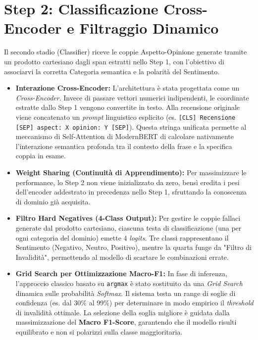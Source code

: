 \documentclass[10pt,a4paper]{report}
\begin{document}
\section{Step 2: Classificazione Cross-Encoder e Filtraggio Dinamico}
Il secondo stadio (Classifier) riceve le coppie Aspetto-Opinione generate tramite un prodotto cartesiano dagli span estratti nello Step 1, con l'obiettivo di associarvi la corretta Categoria semantica e la polarità del Sentimento.

\begin{itemize}
    \item \textbf{Interazione Cross-Encoder:} L'architettura è stata progettata come un \textit{Cross-Encoder}. Invece di passare vettori numerici indipendenti, le coordinate estratte dallo Step 1 vengono convertite in testo. Alla recensione originale viene concatenato un \textit{prompt} linguistico esplicito (es. \texttt{[CLS] Recensione [SEP] aspect: X opinion: Y [SEP]}). Questa stringa unificata permette al meccanismo di Self-Attention di ModernBERT di calcolare nativamente l'interazione semantica profonda tra il contesto della frase e la specifica coppia in esame.
    \item \textbf{Weight Sharing (Continuità di Apprendimento):} Per massimizzare le performance, lo Step 2 non viene inizializzato da zero, bensì eredita i pesi dell'encoder addestrato in precedenza nello Step 1, sfruttando la conoscenza di dominio già acquisita.
    \item \textbf{Filtro Hard Negatives (4-Class Output):} Per gestire le coppie fallaci generate dal prodotto cartesiano, ciascuna testa di classificazione (una per ogni categoria del dominio) emette 4 \textit{logits}. Tre classi rappresentano il Sentimento (Negativo, Neutro, Positivo), mentre la quarta funge da "Filtro di Invalidità", permettendo al modello di scartare le combinazioni errate.
    \item \textbf{Grid Search per Ottimizzazione Macro-F1:} In fase di inferenza, l'approccio classico basato su \texttt{argmax} è stato sostituito da una \textit{Grid Search} dinamica sulle probabilità \textit{Softmax}. Il sistema testa un range di soglie di confidenza (es. dal 30\% al 99\%) per determinare in modo empirico il \textit{threshold} di invalidità ottimale. La selezione della soglia migliore è guidata dalla massimizzazione del \textbf{Macro F1-Score}, garantendo che il modello risulti equilibrato e non si polarizzi sulla classe maggioritaria.
\end{itemize}
\end{document}

